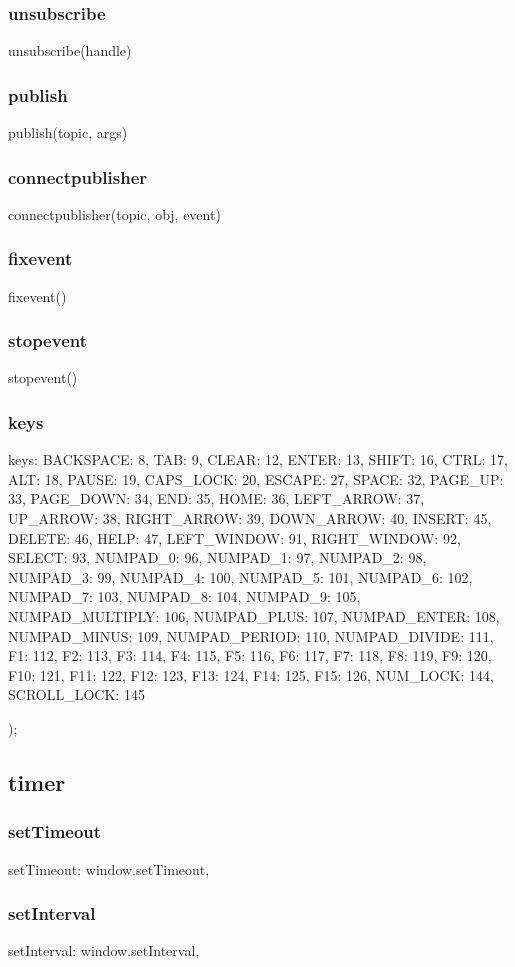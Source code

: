 {\subsubsection*{unsubscribe}
unsubscribe(handle)
\subsubsection*{publish}
publish(topic, args)
\subsubsection*{connectpublisher}
connectpublisher(topic, obj, event)
\subsubsection*{fixevent}
fixevent()
\subsubsection*{stopevent}
stopevent()
\subsubsection*{keys}
keys: { BACKSPACE: 8, TAB: 9, CLEAR: 12, ENTER: 13, SHIFT: 16, CTRL: 17, ALT: 18, PAUSE: 19, CAPS_LOCK: 20, 
		    ESCAPE: 27, SPACE: 32, PAGE_UP: 33, PAGE_DOWN: 34, END: 35, HOME: 36, LEFT_ARROW: 37, UP_ARROW: 38,
		    RIGHT_ARROW: 39, DOWN_ARROW: 40, INSERT: 45, DELETE: 46, HELP: 47, LEFT_WINDOW: 91, RIGHT_WINDOW: 92,
		    SELECT: 93, NUMPAD_0: 96, NUMPAD_1: 97, NUMPAD_2: 98, NUMPAD_3: 99, NUMPAD_4: 100, NUMPAD_5: 101,
		    NUMPAD_6: 102, NUMPAD_7: 103, NUMPAD_8: 104, NUMPAD_9: 105, NUMPAD_MULTIPLY: 106, NUMPAD_PLUS: 107,
		    NUMPAD_ENTER: 108, NUMPAD_MINUS: 109, NUMPAD_PERIOD: 110, NUMPAD_DIVIDE: 111, F1: 112, F2: 113, F3: 114,
		    F4: 115, F5: 116, F6: 117, F7: 118, F8: 119, F9: 120, F10: 121, F11: 122, F12: 123, F13: 124, 
		    F14: 125, F15: 126, NUM_LOCK: 144, SCROLL_LOCK: 145 }
    });

\subsection{timer}
\subsubsection*{setTimeout}
setTimeout: window.setTimeout,
\subsubsection*{setInterval}
setInterval: window.setInterval,
